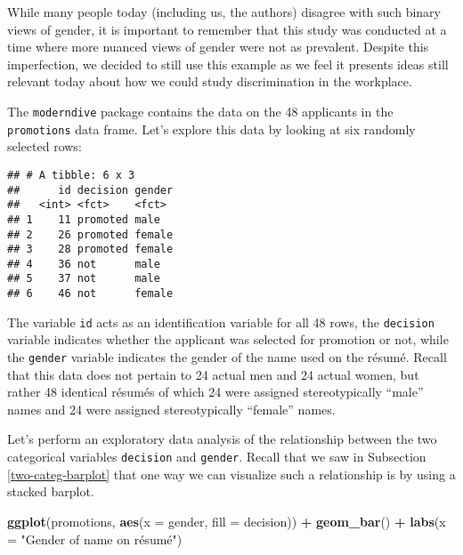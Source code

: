\documentclass[
]{book}
\newenvironment{Shaded}{\begin{snugshade}}{\end{snugshade}}
\newcommand{\DataTypeTok}[1]{\textcolor[rgb]{0.13,0.29,0.53}{#1}}
\newcommand{\DecValTok}[1]{\textcolor[rgb]{0.00,0.00,0.81}{#1}}
\newcommand{\KeywordTok}[1]{\textcolor[rgb]{0.13,0.29,0.53}{\textbf{#1}}}
\newcommand{\NormalTok}[1]{#1}
\newcommand{\OperatorTok}[1]{\textcolor[rgb]{0.81,0.36,0.00}{\textbf{#1}}}
\newcommand{\StringTok}[1]{\textcolor[rgb]{0.31,0.60,0.02}{#1}}
\begin{document}
While many people today (including us, the authors) disagree with such binary views of gender, it is important to remember that this study was conducted at a time where more nuanced views of gender were not as prevalent. Despite this imperfection, we decided to still use this example as we feel it presents ideas still relevant today about how we could study discrimination in the workplace.

The \texttt{moderndive} package contains the data on the 48 applicants in the \texttt{promotions} data frame. Let's explore this data by looking at six randomly selected rows:

\begin{Shaded}
\end{Shaded}

\begin{verbatim}
## # A tibble: 6 x 3
##      id decision gender
##   <int> <fct>    <fct> 
## 1    11 promoted male  
## 2    26 promoted female
## 3    28 promoted female
## 4    36 not      male  
## 5    37 not      male  
## 6    46 not      female
\end{verbatim}

The variable \texttt{id} acts as an identification variable for all 48 rows, the \texttt{decision} variable indicates whether the applicant was selected for promotion or not, while the \texttt{gender} variable indicates the gender of the name used on the résumé. Recall that this data does not pertain to 24 actual men and 24 actual women, but rather 48 identical résumés of which 24 were assigned stereotypically ``male'' names and 24 were assigned stereotypically ``female'' names.

Let's perform an exploratory data analysis of the relationship between the two categorical variables \texttt{decision} and \texttt{gender}. Recall that we saw in Subsection \ref{two-categ-barplot} that one way we can visualize such a relationship is by using a stacked barplot.

\begin{Shaded}
\begin{Highlighting}[]
\KeywordTok{ggplot}\NormalTok{(promotions, }\KeywordTok{aes}\NormalTok{(}\DataTypeTok{x =}\NormalTok{ gender, }\DataTypeTok{fill =}\NormalTok{ decision)) }\OperatorTok{+}
\StringTok{  }\KeywordTok{geom_bar}\NormalTok{() }\OperatorTok{+}
\StringTok{  }\KeywordTok{labs}\NormalTok{(}\DataTypeTok{x =} \StringTok{"Gender of name on résumé"}\NormalTok{)}
\end{Highlighting}
\end{Shaded}
\end{document}
